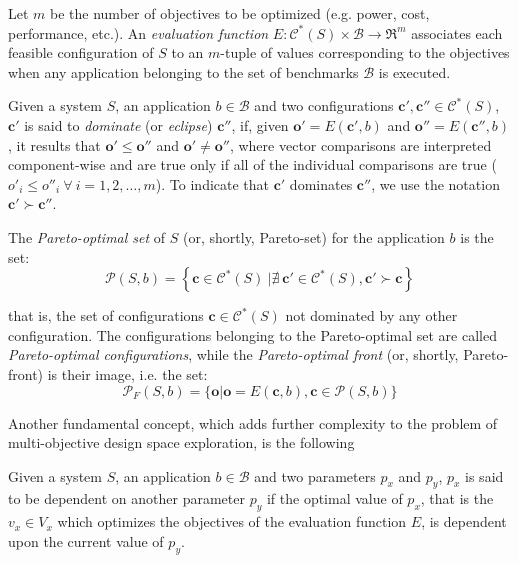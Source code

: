 Let $m$ be the number of objectives to be optimized (e.g. power,
cost, performance, etc.). An {\em evaluation function}
$E:\mathcal{C}^*(S)\times \mathcal{B} \longrightarrow \Re^m$ associates each feasible configuration of $S$ to
an $m$-tuple of values corresponding to the objectives when any application belonging to the set of benchmarks
$\mathcal{B}$ is executed.

Given a system $S$, an application $b \in \mathcal{B}$ and two
configurations $\mathbf{c}', \mathbf{c}'' \in \mathcal{C}^*(S)$,
$\mathbf{c}'$ is said to {\em dominate} (or {\em eclipse})
$\mathbf{c}''$, if, given $\mathbf{o}'=E(\mathbf{c}', b)$ and
$\mathbf{o}''=E(\mathbf{c}'', b)$, it results that $\mathbf{o}'
\leq \mathbf{o}''$ and $\mathbf{o}' \neq \mathbf{o}''$, where
vector comparisons are interpreted component-wise and are true
only if all of the individual comparisons are true ($o'_i \leq
o''_i \ \forall \ i = 1,2,\ldots,m$). To indicate that 
$\mathbf{c}'$ dominates $\mathbf{c}''$, we use the notation
$\mathbf{c}' \succ \mathbf{c}''$.

\begin{definition}
The {\em Pareto-optimal set} of $S$ (or, shortly, Pareto-set) for the application $b$ is the
set:
\[ \mathcal{P}(S,b) = \left\{ \mathbf{c} \in \mathcal{C}^*(S) \ | \nexists \ \mathbf{c}' \in \mathcal{C}^*(S), \mathbf{c}' \succ \mathbf{c} \right\} \]
\end{definition}
that is, the set of configurations $\mathbf{c} \in
\mathcal{C}^*(S)$ not dominated by any other configuration.
The configurations belonging to the Pareto-optimal set are called \emph{Pareto-optimal configurations}, while the {\em Pareto-optimal front} (or, shortly, Pareto-front) is their image, i.e. the set:
\[ \mathcal{P}_{F}(S,b) = \{ \mathbf{o} | \mathbf{o} = E(\mathbf{c},b), \mathbf{c} \in \mathcal{P}(S,b) \} \]

Another fundamental concept, which adds further complexity to the
problem of multi-objective design space exploration, is the following

\begin{definition}
Given a system $S$, an application $b \in \mathcal{B}$ and two parameters
$p_x$ and $p_y$, $p_x$ is said to
be dependent on another parameter $p_y$ if the optimal value of $p_x$,
that is the $v_{x} \in V_x$ which optimizes the objectives of the
evaluation function $E$, is dependent upon the current value of $p_y$. 
\end{definition}

